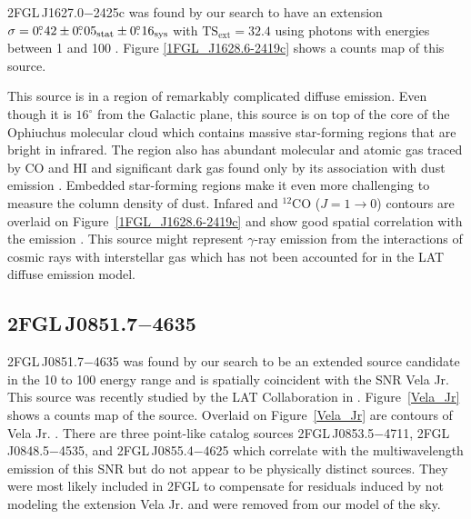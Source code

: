 \documentclass[12pt,preprint]{aastex}
\newcommand{\gev}{\text{GeV}\xspace}
\newcommand{\tev}{\text{TeV}\xspace}
\newcommand{\tsext}{{\ensuremath{\text{TS}_{\text{ext}}}}\xspace}
\newcommand{\sys}{\text{sys}\xspace}
\newcommand{\stat}{\text{stat}\xspace}
\newcommand{\degree}{^\circ\xspace}
\begin{document}

2FGL\,J1627.0$-$2425c was found by our search to
have an extension $\sigma=0\fdg42\pm0\fdg05_\stat\pm0\fdg16_\sys$ with
$\tsext=32.4$
using photons with energies between 1 \gev and 100 \gev.  
Figure \ref{1FGL_J1628.6-2419c} shows a counts map of this source.

This source is in a region of remarkably complicated diffuse emission.
Even though it is $16\degree$ from the Galactic plane, this source is on
top of the core of the Ophiuchus molecular cloud which contains massive
star-forming regions that are bright in infrared.  The region also has
abundant molecular and atomic gas traced by CO and HI and significant 
dark gas found only by its association with dust emission
\citep{isabelle_dark_gass}. Embedded star-forming regions make it even
more challenging to measure the column density of dust.  Infared and 
${}^{12}\text{CO}$ ($J=1\rightarrow 0$)
contours are overlaid on Figure~\ref{1FGL_J1628.6-2419c} and show good
spatial correlation with the \gev emission \citep{iras_rho_ophiuci,co_rho_ophiuci}.
This source might 
represent $\gamma$-ray emission from the interactions of cosmic rays with
interstellar gas which has not been accounted for in the LAT diffuse
emission model.


\subsection{2FGL\,J0851.7$-$4635}
\label{section_2FGL_J0851.7-4635}


2FGL\,J0851.7$-$4635 was found by our search to be an extended source
candidate in the 10 \gev to 100 \gev energy range and is spatially
coincident with the SNR Vela Jr. This source was recently studied by the LAT
Collaboration in \cite{vela_jr_lat}.  Figure~\ref{Vela_Jr} shows a counts
map of the source.  Overlaid on Figure~\ref{Vela_Jr} are \tev
contours of Vela Jr. \citep{vela_jr_hess}.
There are three
point-like catalog sources 2FGL\,J0853.5$-$4711, 2FGL\,J0848.5$-$4535,
and 2FGL\,J0855.4$-$4625 which correlate with the 
multiwavelength
emission of
this SNR but do not appear to be physically distinct sources.
They were most likely included in 2FGL to compensate for residuals
induced by not modeling the extension Vela Jr. and were removed
from our model of the sky.  
\end{document}
